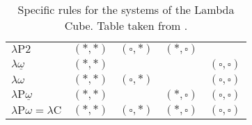 \documentclass[12pt,toc=bibliography,numbers=noendperiod,
               footnotes=multiple,twoside]{scrartcl}
\begin{document}
\begin{enumerate}
\begin{table}[h]
\begin{tabular}{l l l l l}
        \(\lambda\textrm{P2}\) & \((*,*)\) & \((\square, *)\) & \((*,\square)\) & \\

        \(\lambda\underline{\omega}\) & \((*,*)\) & & & \((\square, \square)\) \\

        \(\lambda\omega\) & \((*,*)\) & \((\square, *)\) & & \((\square, \square)\) \\

        \(\lambda\textrm{P}\underline{\omega}\) & \((*,*)\) & & \((*,\square)\) & \((\square, \square)\) \\

        \(\lambda\textrm{P}\omega = \lambda\textrm{C}\) & \((*,*)\) & \((\square, *)\) & \((*,\square)\) & \((\square, \square)\) \\

        \bottomrule
    \end{tabular}
    \caption{Specific rules for the systems of the Lambda Cube. Table taken from \textcite[205]{barendregt_lambda_1992}.}
    \label{tab:lambda-cube-s-rules}
\end{table}
\end{enumerate}
\end{document}
